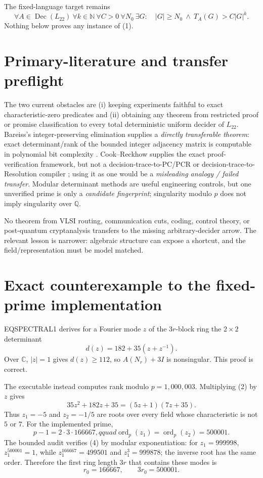 \documentclass[11pt]{article}
\newcommand{\Ltwo}{L_{22}}
\begin{document}
The fixed-language target remains
\[
 \forall A\in\operatorname{Dec}(\Ltwo)\ \forall k\in\mathbb N\
 \forall C>0\ \forall N_0\ \exists G:\quad
 |G|\ge N_0\ \land\ T_A(G)>C|G|^k.                     \tag{1}
\]
Nothing below proves any instance of (1).

\section{Primary-literature and transfer preflight}
The two current obstacles are (i) keeping experiments faithful to exact
characteristic-zero predicates and (ii) obtaining any theorem from restricted
proof or promise classification to every total deterministic uniform decider
of $\Ltwo$.  Bareiss's integer-preserving elimination supplies a
\emph{directly transferable theorem}: exact determinant/rank of the bounded
integer adjacency matrix is computable in polynomial bit complexity
\cite{bareiss}.  Cook--Reckhow supplies the exact proof-verification framework,
but not a decision-trace-to-PC/PCR or decision-trace-to-Resolution compiler
\cite{cr}; using it as one would be a \emph{misleading analogy / failed
transfer}.  Modular determinant methods are useful engineering controls, but
one unverified prime is only a \emph{candidate fingerprint}; singularity
modulo $p$ does not imply singularity over $\mathbb Q$.

No theorem from VLSI routing, communication cuts, coding, control theory, or
post-quantum cryptanalysis transfers to the missing arbitrary-decider arrow.
The relevant lesson is narrower: algebraic structure can expose a shortcut,
and the field/representation must be model matched.

\section{Exact counterexample to the fixed-prime implementation}
EQSPECTRAL1 derives for a Fourier mode $z$ of the $3r$-block ring the
$2\times2$ determinant
\[
 d(z)=182+35(z+z^{-1}).                                 \tag{2}
\]
Over $\mathbb C$, $|z|=1$ gives $d(z)\ge112$, so
$A(N_r)+3I$ is nonsingular.  This proof is correct.

The executable instead computes rank modulo $p=1{,}000{,}003$.  Multiplying
(2) by $z$ gives
\[
 35z^2+182z+35=(5z+1)(7z+35).                           \tag{3}
\]
Thus $z_1=-5$ and $z_2=-1/5$ are roots over every field whose characteristic
is not $5$ or $7$.  For the implemented prime,
\[
 p-1=2\cdot3\cdot166667,qquad
 \operatorname{ord}_p(z_1)=\operatorname{ord}_p(z_2)=500001. \tag{4}
\]
The bounded audit verifies (4) by modular exponentiation: for $z_1=999998$,
$z_1^{500001}=1$, while $z_1^{166667}=499501$ and $z_1^3=999878$; the
inverse root has the same order.  Therefore the first ring length $3r$ that
contains these modes is
\[
 r_0=166667,\qquad 3r_0=500001.                         \tag{5}
\]
\end{document}
